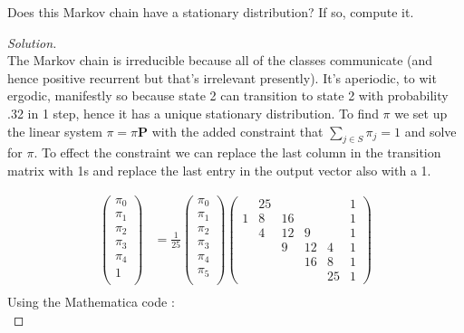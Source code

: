 \documentclass[12pt]{article}
\newenvironment{problem}[2][Problem]{\begin{trivlist}
\item[\hskip \labelsep {\bfseries #1}\hskip \labelsep {\bfseries #2.}]}{\end{trivlist}}
\newenvironment{solution}
  {\begin{proof}[Solution]\renewcommand{\qedsymbol}{}}
  {\end{proof}}
\begin{document}
\begin{problem}{1(b)} %
Does this Markov chain have a stationary distribution? If so, compute it.

\end{problem}
 
\begin{solution}\ \\ 

The Markov chain is irreducible because all of the classes communicate (and hence positive recurrent but that's irrelevant presently). It's aperiodic, to wit ergodic, manifestly so because state 2 can transition to state 2 with probability .32 in 1 step, hence it has a unique stationary distribution. To find $\pi$ we set up the linear system $\pi = \pi \mathbf{P}$ with the added constraint that $\sum_{j \in S}\pi_j = 1$ and solve for $\pi$. To effect the constraint we can replace the last column in the transition matrix with 1s and replace the last entry in the output vector also with a 1. 

\begin{align*}
\begin{pmatrix} 
			\pi_0  \\ 
			\pi_1  \\
			\pi_2  \\ 
			\pi_3  \\
			\pi_4  \\ 
			1  \\
			\end{pmatrix}
			& = \frac{1}{25}\begin{pmatrix} 
			\pi_0  \\ 
			\pi_1  \\
			\pi_2  \\ 
			\pi_3  \\
			\pi_4  \\ 
			\pi_5  \\
			\end{pmatrix}
			\begin{pmatrix} 
			  & 25 &    &    &    & 1 \\ 
			1 & 8  & 16 &    &    & 1\\
			  & 4  & 12 & 9  &    & 1 \\ 
			  &    & 9  & 12 & 4  & 1 \\
			  &    &    & 16 & 8  & 1\\
			  &    &    &    & 25 & 1
			\end{pmatrix} \\
\end{align*}
Using the Mathematica code : \\


\end{solution}
\end{document}
